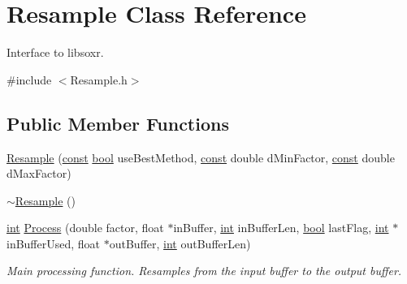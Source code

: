 \hypertarget{class_resample}{}\section{Resample Class Reference}
\label{class_resample}


Interface to libsoxr.  




{\ttfamily \#include $<$Resample.\+h$>$}

\subsection*{Public Member Functions}
\begin{DoxyCompactItemize}
\item 
\hyperlink{class_resample_a0f890f4b116b8c2fb6f8c278a9531e0c}{Resample} (\hyperlink{getopt1_8c_a2c212835823e3c54a8ab6d95c652660e}{const} \hyperlink{mac_2config_2i386_2lib-src_2libsoxr_2soxr-config_8h_abb452686968e48b67397da5f97445f5b}{bool} use\+Best\+Method, \hyperlink{getopt1_8c_a2c212835823e3c54a8ab6d95c652660e}{const} double d\+Min\+Factor, \hyperlink{getopt1_8c_a2c212835823e3c54a8ab6d95c652660e}{const} double d\+Max\+Factor)
\item 
\hyperlink{class_resample_a1a5ec2acb881b38f7d7ced00650d0963}{$\sim$\+Resample} ()
\item 
\hyperlink{xmltok_8h_a5a0d4a5641ce434f1d23533f2b2e6653}{int} \hyperlink{class_resample_ace53c0e6d5002a77858d1da06b1350c3}{Process} (double factor, float $\ast$in\+Buffer, \hyperlink{xmltok_8h_a5a0d4a5641ce434f1d23533f2b2e6653}{int} in\+Buffer\+Len, \hyperlink{mac_2config_2i386_2lib-src_2libsoxr_2soxr-config_8h_abb452686968e48b67397da5f97445f5b}{bool} last\+Flag, \hyperlink{xmltok_8h_a5a0d4a5641ce434f1d23533f2b2e6653}{int} $\ast$in\+Buffer\+Used, float $\ast$out\+Buffer, \hyperlink{xmltok_8h_a5a0d4a5641ce434f1d23533f2b2e6653}{int} out\+Buffer\+Len)
\begin{DoxyCompactList}\small\item\em Main processing function. Resamples from the input buffer to the output buffer. \end{DoxyCompactList}\end{DoxyCompactItemize}
